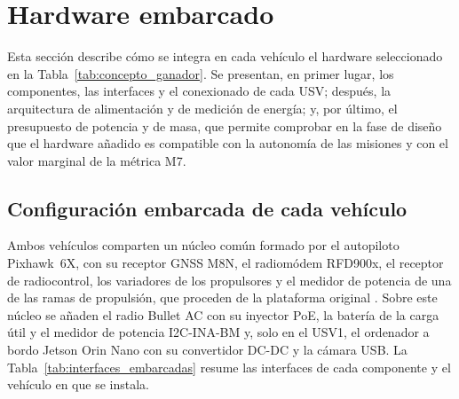 \newpage

\section{Hardware embarcado}
\label{sec:hardware_embarcado}
 
Esta sección describe cómo se integra en cada vehículo el hardware seleccionado en la Tabla~\ref{tab:concepto_ganador}. 
Se presentan, en primer lugar, los componentes, las interfaces y el conexionado de cada USV; después, la arquitectura de 
alimentación y de medición de energía; y, por último, el presupuesto de potencia y de masa, que permite comprobar en la 
fase de diseño que el hardware añadido es compatible con la autonomía de las misiones y con el valor marginal de la 
métrica M7.
 
\subsection{Configuración embarcada de cada vehículo}
\label{subsec:configuracion_embarcada}
 
Ambos vehículos comparten un núcleo común formado por el autopiloto Pixhawk~6X, con su receptor GNSS M8N, el radiomódem 
RFD900x, el receptor de radiocontrol, los variadores de los propulsores y el medidor de potencia de una de las 
ramas de propulsión, que proceden de la plataforma original \cite{iniesta2025}. Sobre este núcleo se añaden el 
radio Bullet AC con su inyector PoE, la batería de la carga útil y el 
medidor de potencia I2C-INA-BM y, solo en el USV1, el ordenador a bordo Jetson Orin Nano con su convertidor DC-DC y la 
cámara USB. La Tabla~\ref{tab:interfaces_embarcadas} resume las interfaces de cada componente y el vehículo en que se 
instala.
 
